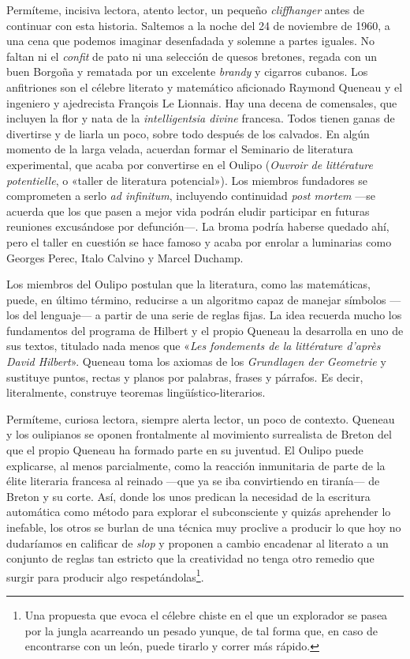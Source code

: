 \documentclass[11pt,a4paper]{article}
\begin{document}
Permíteme, incisiva lectora, atento lector, un pequeño \emph{cliffhanger} antes de continuar con esta historia. Saltemos a la noche del 24 de noviembre de 1960, a una cena que podemos imaginar desenfadada y solemne a partes iguales. No faltan ni el \emph{confit} de pato ni una selección de quesos bretones, regada con un buen Borgoña y rematada por un excelente \emph{brandy} y cigarros cubanos. Los anfitriones son el célebre literato y matemático aficionado Raymond Queneau y el ingeniero y ajedrecista François Le Lionnais. Hay una decena de comensales, que incluyen la flor y nata de la \emph{intelligentsia divine} francesa. Todos tienen ganas de divertirse y de liarla un poco, sobre todo después de los calvados. En algún momento de la larga velada, acuerdan formar el Seminario de literatura experimental, que acaba por convertirse en el Oulipo (\emph{Ouvroir de littérature potentielle}, o «taller de literatura potencial»). Los miembros fundadores se comprometen a serlo \emph{ad infinitum}, incluyendo continuidad \emph{post mortem} ---se acuerda que los que pasen a mejor vida podrán eludir participar en futuras reuniones excusándose por defunción---. La broma podría haberse quedado ahí, pero el taller en cuestión se hace famoso y acaba por enrolar a luminarias como Georges Perec, Italo Calvino y Marcel Duchamp.

Los miembros del Oulipo postulan que la literatura, como las matemáticas, puede, en último término, reducirse a un algoritmo capaz de manejar símbolos ---los del lenguaje--- a partir de una serie de reglas fijas. La idea recuerda mucho los fundamentos del programa de Hilbert y el propio Queneau la desarrolla en uno de sus textos, titulado nada menos que «\emph{Les fondements de la littérature d'après David Hilbert}». Queneau toma los axiomas de los \emph{Grundlagen der Geometrie} y sustituye puntos, rectas y planos por palabras, frases y párrafos. Es decir, literalmente, construye teoremas lingüístico-literarios.

Permíteme, curiosa lectora, siempre alerta lector, un poco de contexto. Queneau y los oulipianos se oponen frontalmente al movimiento surrealista de Breton del que el propio Queneau ha formado parte en su juventud. El Oulipo puede explicarse, al menos parcialmente, como la reacción inmunitaria de parte de la élite literaria francesa al reinado ---que ya se iba convirtiendo en tiranía--- de Breton y su corte. Así, donde los unos predican la necesidad de la escritura automática como método para explorar el subconsciente y quizás aprehender lo inefable, los otros se burlan de una técnica muy proclive a producir lo que hoy no dudaríamos en calificar de \emph{slop} y proponen a cambio encadenar al literato a un conjunto de reglas tan estricto que la creatividad no tenga otro remedio que surgir para producir algo respetándolas\footnote{Una propuesta que evoca el célebre chiste en el que un explorador se pasea por la jungla acarreando un pesado yunque, de tal forma que, en caso de encontrarse con un león, puede tirarlo y correr más rápido.}.
\end{document}
